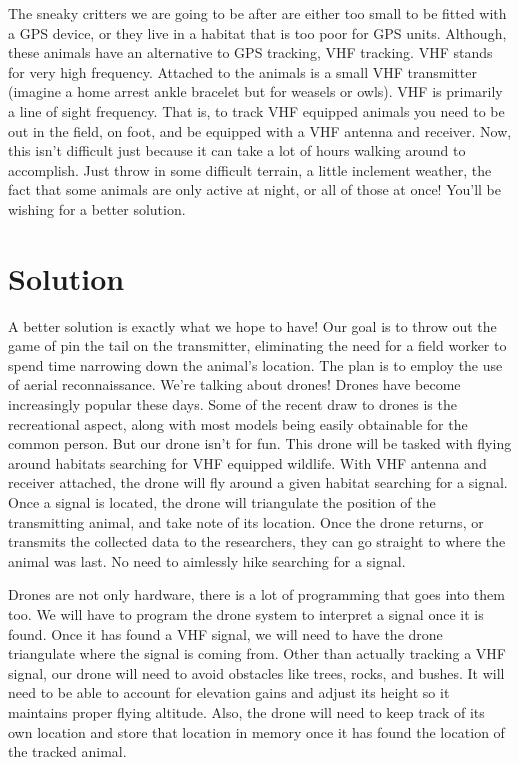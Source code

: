 \documentclass[10pt, draftclsnofoot, onecolumn] {IEEEtran}
\begin{document}
    The sneaky critters we are going to be after are either too small to be fitted with a GPS device, or they live in a habitat that is too poor for GPS units. Although, these animals have an alternative to GPS tracking, VHF tracking.
    VHF stands for very high frequency. Attached to the animals is a small VHF transmitter (imagine a home arrest ankle bracelet but for weasels or owls). VHF is primarily a line of sight frequency. That is, to track VHF equipped animals you need to be out in the field, on foot, and be equipped with a VHF antenna and receiver. Now, this isn't difficult just because it can take a lot of hours walking around to accomplish. Just throw in some difficult terrain, a little inclement weather, the fact that some animals are only active at night, or all of those at once! You'll be wishing for a better solution. 


\section{Solution}
    A better solution is exactly what we hope to have! Our goal is to throw out the game of pin the tail on the transmitter, eliminating the need for a field worker to spend time narrowing down the animal's location. The plan is to employ the use of aerial reconnaissance. We're talking about drones! Drones have become increasingly popular these days. Some of the recent draw to drones is the recreational aspect, along with most models being easily obtainable for the common person. But our drone isn't for fun. This drone will be tasked with flying around habitats searching for VHF equipped wildlife. With VHF antenna and receiver attached, the drone will fly around a given habitat searching for a signal. Once a signal is located, the drone will triangulate the position of the transmitting animal, and take note of its location. Once the drone returns, or transmits the collected data to the researchers, they can go straight to where the animal was last. No need to aimlessly hike searching for a signal. 
    
    Drones are not only hardware, there is a lot of programming that goes into them too. We will have to program the drone system to interpret a signal once it is found. Once it has found a VHF signal, we will need to have the drone triangulate where the signal is coming from. Other than actually tracking a VHF signal, our drone will need to avoid obstacles like trees, rocks, and bushes. It will need to be able to account for elevation gains and adjust its height so it maintains proper flying altitude. Also, the drone will need to keep track of its own location and store that location in memory once it has found the location of the tracked animal.
    
\end{document}
